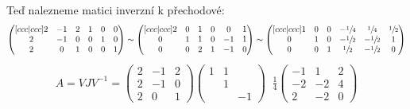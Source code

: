 \documentclass[]{article}
\begin{document}
Teď nalezneme matici inverzní k přechodové:
\begin{align*}
    \begin{pmatrix}[ccc|ccc]
        2 & -1 & 2  &  1 & 0 & 0 \\
        2 & -1 & 0  &  0 & 1 & 0 \\
        2 &  0 & 1  &  0 & 0 & 1
    \end{pmatrix}
    \sim
    \begin{pmatrix}[ccc|ccc]
        2 & 0 & 1  &  0 & 0 & 1 \\
        0 & 1 & 1  &  0 &-1 & 1 \\
        0 & 0 & 2  &  1 &-1 & 0
    \end{pmatrix}
    \sim
    \begin{pmatrix}[ccc|ccc]
        1 & 0 & 0  &  -\sfrac{1}{4} &  \sfrac{1}{4} & \sfrac{1}{2} \\
        0 & 1 & 0  &  -\sfrac{1}{2} & -\sfrac{1}{2} & 1 \\
        0 & 0 & 1  &  \sfrac{1}{2}  & -\sfrac{1}{2} & 0
    \end{pmatrix}
\end{align*}
\begin{align*}
    A = VJV^{-1} =
    \begin{pmatrix}
        2 & -1 & 2 \\
        2 & -1 & 0 \\
        2 &  0 & 1
    \end{pmatrix}
    \begin{pmatrix}
        1 & 1 &   \\
          & 1 &   \\
          &   & -1
    \end{pmatrix}
    \;\;
    \frac{1}{4}
    \begin{pmatrix}
        -1 & 1 & 2 \\
        -2 & -2 & 4 \\
        2 & -2 & 0
    \end{pmatrix}
\end{align*}

\medskip
\medskip
\end{document}
